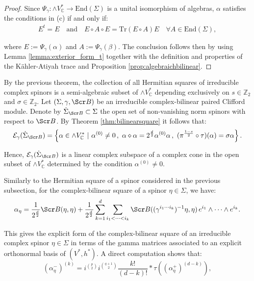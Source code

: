 \documentclass[10pt,a4paper,twoside,reqno]{amsart}
\theoremstyle{plain}
\theoremstyle{definition}
\theoremstyle{remark}
\newcommand{\End}{\mathrm{End}}
\def\C{\mathbb{C}}
\newcommand{\Tr}{\mathrm{Tr}}
\def\scB{\Scr B}
\def\cE{\mathcal{E}}
\begin{document}
\begin{proof}
Since $\Psi_\gamma\colon\wedge V^*_\C\to\End(\Sigma)$ is a unital isomorphism of algebras, $\alpha$ satisfies the conditions in (c) if and only if: 
\begin{eqnarray*}
E^t = E\quad\text{and}\quad E\circ A\circ E = \Tr(E\circ A) E \quad \forall A\in\End(\Sigma),
\end{eqnarray*}

\noindent
where $E:=\Psi_\gamma(\alpha)$ and $A:=\Psi_\gamma(\beta)$. The conclusion follows then by using Lemma \ref{lemma:exterior_form_t} together with the definition and properties of the Kähler-Atiyah trace and Proposition \ref{prop:algebraichbilinear}.
\end{proof}

\noindent
By the previous theorem, the collection of all Hermitian squares of irreducible complex spinors is a semi-algebraic subset of $\wedge V^{\ast}_{\C}$ depending exclusively on $s\in \mathbb{Z}_2$ and $\sigma \in \mathbb{Z}_2$. Let $(\Sigma,\gamma,\scB)$ be an irreducible complex-bilinear paired Clifford module. Denote by $\dot{\Sigma}_{\scB} \subset \Sigma$ the open set of non-vanishing norm spinors with respect to $\scB$. By Theorem \ref{thm:bilinearsquare} it follows that:
\begin{equation*}
\cE_\gamma(\dot{\Sigma}_{\scB}) = \left\{ \alpha\in \wedge V^{\ast}_{\C} \,\, \vert\,\, \alpha^{(0)} \neq 0\, ,  \,\, \alpha\diamond\alpha = 2^{\frac{d}{2}} \alpha^{(0)}\alpha\, , \,\, (\pi^{\frac{1-s}{2}}\circ\tau) (\alpha) = \sigma \alpha  \right\}.
\end{equation*}

\noindent
Hence, $\cE_\gamma(\dot{\Sigma}_{\scB})$ is a linear complex subspace of a complex cone in the open subset of $\wedge V^{\ast}_{\C}$ determined by the condition $\alpha^{(0)} \neq 0$.\medskip

\noindent
Similarly to the Hermitian square of a spinor considered in the previous subsection, for the complex-bilinear square of a spinor $\eta\in \Sigma$, we have: 
\begin{eqnarray}
\label{eq:explicitbilinear}
\alpha_{\eta} = \frac{1}{2^{\frac{d}{2}}} \scB(\eta,\eta) + \frac{1}{2^{\frac{d}{2}}} \sum_{k=1}^d \sum_{i_1 < \cdots < i_k} \scB((\gamma^{i_1 \cdots i_k})^{-1}\eta , \eta)\, e^{i_1}\wedge  \cdots \wedge e^{i_k}.
\end{eqnarray}

\noindent
This gives the explicit form of the complex-bilinear square of an irreducible complex spinor $\eta \in \Sigma$ in terms of the gamma matrices associated to an explicit orthonormal basis of $(V^{\ast} , h^{\ast})$. A direct computation shows that:
\begin{equation*}
(\alpha_\eta^-)^{(k)}=i^{\binom{p}{2}}i^{\binom{q+1}{2}}\frac{k!}{(d-k)!}*\tau((\alpha_\eta^+)^{(d-k)}),
\end{equation*}
\end{document}
